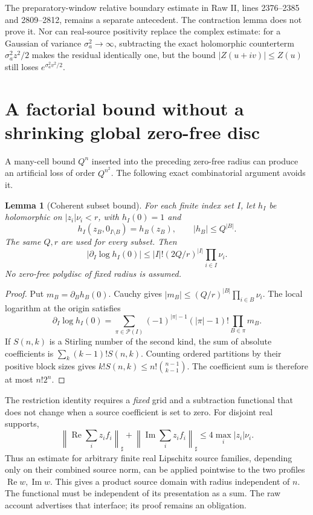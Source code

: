 \documentclass[11pt]{article}
\newtheorem{lemma}[proposition]{Lemma}
\theoremstyle{remark}
\newcommand{\Rea}{\operatorname{Re}}
\newcommand{\Ima}{\operatorname{Im}}
\newcommand{\norm}[1]{\left\|#1\right\|}
\begin{document}
The preparatory-window relative boundary estimate in Raw II,
lines 2376--2385 and 2809--2812, remains a separate antecedent.
The contraction lemma does not prove it. Nor can real-source positivity
replace the complex estimate: for a Gaussian of variance
$\sigma_a^2\to\infty$, subtracting the exact holomorphic counterterm
$\sigma_a^2z^2/2$ makes the residual identically one, but the bound
$|Z(u+iv)|\leq Z(u)$ still loses $e^{\sigma_a^2v^2/2}$.

\section{A factorial bound without a shrinking global zero-free disc}

A many-cell bound $Q^n$ inserted into the preceding zero-free radius can
produce an artificial loss of order $Q^{n^2}$. The following exact
combinatorial argument avoids it.

\begin{lemma}[Coherent subset bound]
For each finite index set $I$, let $h_I$ be holomorphic on
$|z_i|\nu_i<r$, with $h_I(0)=1$ and
\[
h_I(z_B,0_{I\setminus B})=h_B(z_B),\qquad |h_B|\leq Q^{|B|}.
\]
The same $Q,r$ are used for every subset. Then
\[
|\partial_I\log h_I(0)|
\leq |I|!(2Q/r)^{|I|}\prod_{i\in I}\nu_i.
\tag{3.1}
\]
No zero-free polydisc of fixed radius is assumed.
\end{lemma}
\begin{proof}
Put $m_B=\partial_Bh_B(0)$. Cauchy gives
$|m_B|\leq(Q/r)^{|B|}\prod_{i\in B}\nu_i$.
The local logarithm at the origin satisfies
\[
\partial_I\log h_I(0)=
\sum_{\pi\in\mathcal P(I)}
(-1)^{|\pi|-1}(|\pi|-1)!\prod_{B\in\pi}m_B.
\]
If $S(n,k)$ is a Stirling number of the second kind, the sum of absolute
coefficients is $\sum_k(k-1)!S(n,k)$.
Counting ordered partitions by their positive block sizes gives
$k!S(n,k)\leq n!\binom{n-1}{k-1}$.
The coefficient sum is therefore at most $n!2^n$.
\end{proof}

The restriction identity requires a \emph{fixed} grid and a subtraction
functional that does not change when a source coefficient is set to zero.
For disjoint real supports,
\[
\norm{\Rea\sum_i z_i f_i}_\sharp+
\norm{\Ima\sum_i z_i f_i}_\sharp
\leq4\max_i|z_i|\nu_i.
\]
Thus an estimate for arbitrary finite real Lipschitz source families,
depending only on their combined source norm, can be applied pointwise
to the two profiles $\Rea w,\Ima w$. This gives a product source domain
with radius independent of $n$. The functional must be independent of
its presentation as a sum. The raw account advertises that interface;
its proof remains an obligation.
\end{document}
